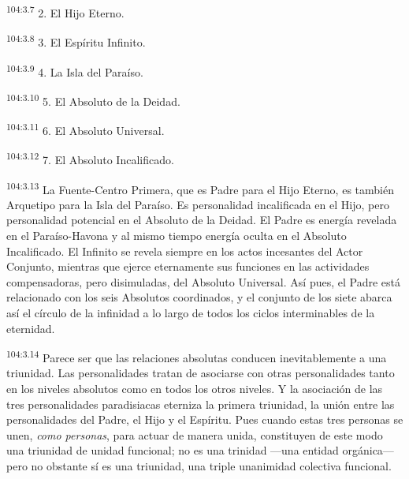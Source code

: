 \documentclass[twoside, 11pt]{book}
\begin{document}
\par
\textsuperscript{104:3.7} 2. El Hijo Eterno.

\par
\textsuperscript{104:3.8} 3. El Espíritu Infinito.

\par
\textsuperscript{104:3.9} 4. La Isla del Paraíso.

\par
\textsuperscript{104:3.10} 5. El Absoluto de la Deidad.

\par
\textsuperscript{104:3.11} 6. El Absoluto Universal.

\par
\textsuperscript{104:3.12} 7. El Absoluto Incalificado.

\par
\textsuperscript{104:3.13} La Fuente-Centro Primera, que es Padre para el Hijo Eterno, es también Arquetipo para la Isla del Paraíso. Es personalidad incalificada en el Hijo, pero personalidad potencial en el Absoluto de la Deidad. El Padre es energía revelada en el Paraíso-Havona y al mismo tiempo energía oculta en el Absoluto Incalificado. El Infinito se revela siempre en los actos incesantes del Actor Conjunto, mientras que ejerce eternamente sus funciones en las actividades compensadoras, pero disimuladas, del Absoluto Universal. Así pues, el Padre está relacionado con los seis Absolutos coordinados, y el conjunto de los siete abarca así el círculo de la infinidad a lo largo de todos los ciclos interminables de la eternidad.

\par
\textsuperscript{104:3.14} Parece ser que las relaciones absolutas conducen inevitablemente a una triunidad. Las personalidades tratan de asociarse con otras personalidades tanto en los niveles absolutos como en todos los otros niveles. Y la asociación de las tres personalidades paradisiacas eterniza la primera triunidad, la unión entre las personalidades del Padre, el Hijo y el Espíritu. Pues cuando estas tres personas se unen, \textit{como personas}, para actuar de manera unida, constituyen de este modo una triunidad de unidad funcional; no es una trinidad ---una entidad orgánica--- pero no obstante sí es una triunidad, una triple unanimidad colectiva funcional.
\end{document}
